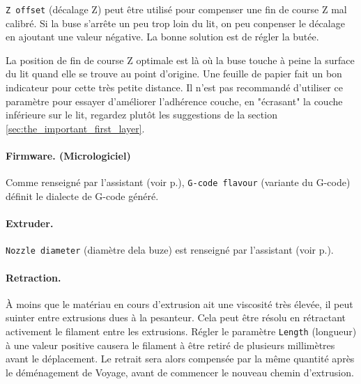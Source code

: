 \texttt{Z offset} (décalage Z) peut être utilisé pour compenser une fin de course Z mal calibré. Si la buse s'arrête un peu trop loin du lit, on peu conpenser le décalage en ajoutant une valeur négative. La bonne solution est de régler la butée.

La position de fin de course Z optimale est là où la buse touche à peine la surface du lit quand elle se trouve au point d'origine. Une feuille de papier fait un bon indicateur pour cette très petite distance. Il n'est pas recommandé d'utiliser ce paramètre pour essayer d'améliorer l'adhérence couche, en "écrasant" la couche inférieure sur le lit, regardez plutôt les suggestions de la section \ref{sec:the_important_first_layer}.

\paragraph{Firmware. (Micrologiciel)} %
\label{par:firmware}
Comme renseigné par l'assistant (voir p.\pageref{sub:1_firmware_type}), \texttt{G-code flavour} (variante du G-code) définit le dialecte de G-code généré.


\paragraph{Extruder.} %
\label{par:extruder}
\texttt{Nozzle diameter} (diamètre dela buze) est renseigné par l'assistant (voir p.\pageref{sub:3_nozzle_diameter}).

\paragraph{Retraction.} %
\label{par:retraction}
À moins que le matériau en cours d'extrusion ait une viscosité très élevée, il peut suinter entre extrusions dues à la pesanteur. Cela peut être résolu en rétractant activement le filament entre les extrusions.  Régler le paramètre \texttt{Length} (longueur) à une valeur positive causera le filament à être retiré de plusieurs millimètres avant le déplacement. Le retrait sera alors compensée par la même quantité après le déménagement de Voyage, avant de commencer le nouveau chemin d'extrusion.

